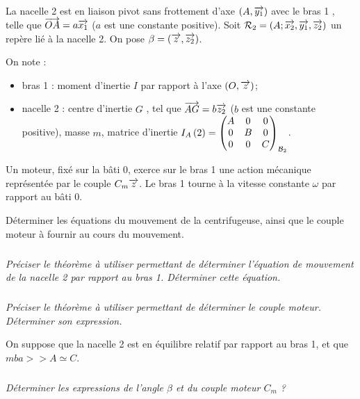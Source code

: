 \documentclass[10pt,fleqn]{article} %
\begin{document}
\begin{multicols}{2}
La nacelle 2 est en liaison pivot sans frottement d’axe $\axe{A}{y_1}$ avec le bras 1 , telle que $\vect{OA}=a\vect{x_1}$ ($a$ est une constante positive). Soit $\mathcal{R}_2=\repere{A}{x_2}{y_1}{z_2}$ un repère lié à la nacelle 2. On pose $\beta=\angl{z}{z_2}$. 

On note :
\begin{itemize}
\item bras 1 : moment d’inertie $I$ par rapport à l’axe $\axe{O}{z}$;
\item nacelle 2 : centre d’inertie $G$ , tel que $\vect{AG}=b\vect{z_2}$ ($b$ est une constante positive), masse $m$, 
matrice d’inertie $\inertie{A}{2}=\matinertie{A}{B}{C}{0}{0}{0}{\mathcal{B}_2}$. 
\end{itemize}
Un moteur, fixé sur la bâti 0, exerce sur le bras 1 une action mécanique représentée par le couple $C_m\vect{z}$.
Le bras 1 tourne à la vitesse constante $\omega$ par rapport au bâti 0.

\begin{obj}
Déterminer les équations du mouvement de la centrifugeuse, ainsi que le couple moteur à fournir au cours du
mouvement.
\end{obj}

\subparagraph{}
\textit{Préciser le théorème à utiliser permettant de déterminer l’équation de mouvement de la nacelle 2 par rapport au
bras 1. Déterminer cette équation.}
\ifprof
\begin{corrige}
\end{corrige}
\else
\fi

\subparagraph{}
\textit{Préciser le théorème à utiliser permettant de déterminer le couple moteur. Déterminer son expression.}
\ifprof
\begin{corrige}
\end{corrige}
\else
\fi

On suppose que la nacelle 2 est en équilibre relatif par rapport au bras 1, et que $mba> > A \simeq C$.

\subparagraph{}
\textit{Déterminer les expressions de l’angle $\beta$ et du couple moteur $C_m$ ?}
\ifprof
\begin{corrige}
\end{corrige}
\else
\fi



\end{multicols}
\newpage
\end{document}
